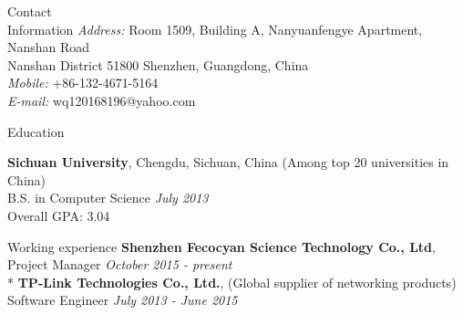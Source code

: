 \documentclass{resume} %
\begin{document}
	
\begin{rSection}{Contact\\Information}
\textit{Address:} Room 1509, Building A, Nanyuanfengye Apartment, Nanshan Road\\
Nanshan District 51800 Shenzhen, Guangdong, China\\
\textit{Mobile:} +86-132-4671-5164\\
\textit{E-mail:} wq120168196@yahoo.com
\end{rSection}


\begin{rSection}{Education}

{\bf Sichuan University}, Chengdu, Sichuan, China \hfill {(Among top 20 universities in China)} \\ 
B.S. in Computer Science \hfill {\em July 2013} \\
Overall GPA: 3.04

\end{rSection}

\begin{rSection}{Working experience}
	{\bf Shenzhen Fecocyan Science Technology Co., Ltd},\\
	Project Manager  \hfill {\em October 2015 - present}\\*	
	{\bf TP-Link Technologies Co., Ltd.}, \hfill {(Global supplier of networking products)} \\
	Software Engineer  \hfill {\em July 2013 - June 2015}
\end{rSection}

\end{document}
